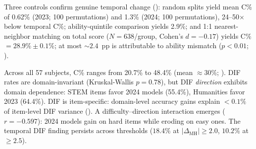 Three controls confirm genuine temporal change (): random splits yield mean C\% of 0.62\% (2023; 100 permutations) and 1.3\% (2024; 100 permutations), 24--50$\times$ below temporal C\%; ability-quintile comparison yields 2.9\%; and 1:1 nearest-neighbor matching on total score ($N{=}638$/group, Cohen's $d = -0.17$) yields C\% $= 28.9\% \pm 0.1\%$; at most ${\sim}2.4$~pp is attributable to ability mismatch ($p < 0.01$; ).

Across all 57 subjects, C\% ranges from 20.7\% to 48.4\% (mean $\approx 30\%$; ). DIF rates are domain-invariant (Kruskal-Wallis $p = 0.78$), but DIF \emph{direction} exhibits domain dependence: STEM items favor 2024 models (55.4\%), Humanities favor 2023 (64.4\%). DIF is item-specific: domain-level accuracy gains explain ${<}0.1\%$ of item-level DIF variance (). A difficulty--direction interaction emerges ($r = -0.597$): 2024 models gain on hard items while eroding on easy ones. The temporal DIF finding persists across thresholds ($18.4\%$ at $|\Delta_{\mathrm{MH}}| \geq 2.0$, $10.2\%$ at $\geq 2.5$).

\begin{table}[t]
\centering
\caption{DIF landscape across cohort definitions. ETS~C denotes the percentage of items with $|\Delta_{\mathrm{MH}}| \geq 1.5$. C\% (web-clean) is the DIF-C flagging rate among items classified as web-clean by \citet{li2024contamination}. Enrichment is the ratio of observed to expected overlap between DIF flags and web-overlap labels. Dashes (--) indicate comparisons where Li et al.\ labels are not applicable.}
\label{tab:temporal_landscape}
\small
{}
\end{table}

